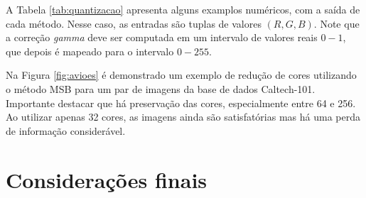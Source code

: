 A Tabela \ref{tab:quantizacao} apresenta alguns examplos numéricos, com a saída de cada método. Nesse caso, as entradas são tuplas de valores $(R, G, B)$. Note que a correção \textit{gamma} deve ser computada em um intervalo de valores reais $0-1$, que depois é mapeado para o intervalo $0-255$.

Na Figura \ref{fig:avioes} é demonstrado um exemplo de redução de cores utilizando o método MSB para um par de imagens da base de dados Caltech-101. Importante destacar que há preservação das cores, especialmente entre 64 e 256. Ao utilizar apenas 32 cores, as imagens ainda são satisfatórias mas há uma perda de informação considerável.

\section{Considerações finais}
